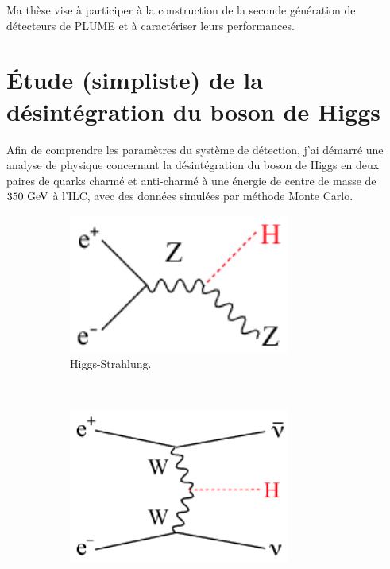   Ma thèse vise à participer à la construction de la seconde génération de détecteurs de PLUME et à caractériser leurs performances.

  \section{Étude (simpliste) de la désintégration du boson de Higgs}

  Afin de comprendre les paramètres du système de détection, j'ai démarré une analyse de physique concernant la désintégration du boson de Higgs en deux paires de quarks charmé et anti-charmé à une énergie de centre de masse de $350~\rm{GeV}$ à l'ILC, avec des données simulées par méthode Monte Carlo.

    \begin{figure}  
        \centering
        \begin{subfigure}[t]{0.3\textwidth}
            \includegraphics[width = 0.8\textwidth]{Pictures/Higgs/Chapter_Theory_figs_ZHdiagram.png}
            \caption{Higgs-Strahlung.}
            \label{fig:higgsStrahlung_resume}
        \end{subfigure}
        ~%
        \begin{subfigure}[t]{0.3\textwidth}
            \includegraphics[width = 0.8\textwidth]{Pictures/Higgs/Chapter_Theory_figs_nunuHdiagram.png}

\end{subfigure}
\end{figure}
